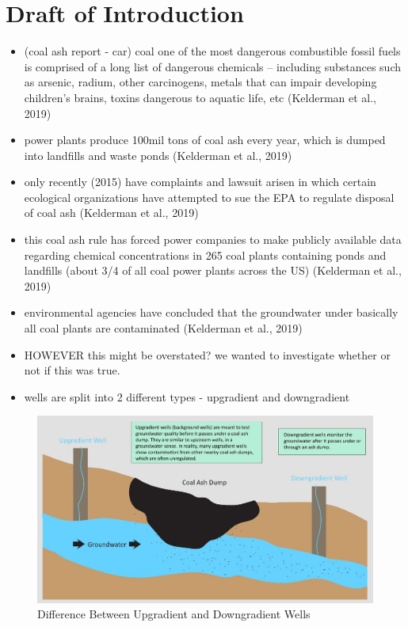 \documentclass[12pt, twoside]{amherstthesis}
\begin{document}
\hypertarget{draft-of-introduction}{%
\section{Draft of Introduction}\label{draft-of-introduction}}
\begin{itemize}
\item
  (coal ash report - car) coal one of the most dangerous combustible fossil fuels is comprised of a long list of dangerous chemicals -- including substances such as arsenic, radium, other carcinogens, metals that can impair developing children's brains, toxins dangerous to aquatic life, etc (Kelderman et al., 2019)
\item
  power plants produce 100mil tons of coal ash every year, which is dumped into landfills and waste ponds (Kelderman et al., 2019)
\item
  only recently (2015) have complaints and lawsuit arisen in which certain ecological organizations have attempted to sue the EPA to regulate disposal of coal ash (Kelderman et al., 2019)
\item
  this coal ash rule has forced power companies to make publicly available data regarding chemical concentrations in 265 coal plants containing ponds and landfills (about 3/4 of all coal power plants across the US) (Kelderman et al., 2019)
\item
  environmental agencies have concluded that the groundwater under basically all coal plants are contaminated (Kelderman et al., 2019)
\item
  HOWEVER this might be overstated? we wanted to investigate whether or not if this was true.
\item
  wells are split into 2 different types - upgradient and downgradient
\end{itemize}
\begin{figure}

{\centering \includegraphics[width=1\linewidth]{figures/upgradientdowngradient} 

}

\caption{Difference Between Upgradient and Downgradient Wells}\label{fig:upgradientdowngradient}
\end{figure}
\end{document}
